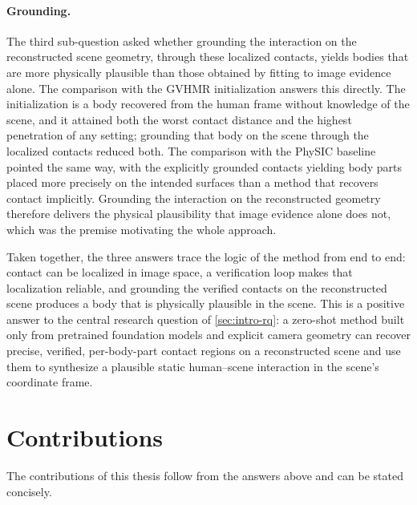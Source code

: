 \paragraph{Grounding.} The third sub-question asked whether grounding the interaction on the reconstructed scene geometry, through these localized contacts, yields bodies that are more physically plausible than those obtained by fitting to image evidence alone. The comparison with the GVHMR initialization answers this directly. The initialization is a body recovered from the human frame without knowledge of the scene, and it attained both the worst contact distance and the highest penetration of any setting; grounding that body on the scene through the localized contacts reduced both. The comparison with the PhySIC baseline pointed the same way, with the explicitly grounded contacts yielding body parts placed more precisely on the intended surfaces than a method that recovers contact implicitly. Grounding the interaction on the reconstructed geometry therefore delivers the physical plausibility that image evidence alone does not, which was the premise motivating the whole approach.

Taken together, the three answers trace the logic of the method from end to end: contact can be localized in image space, a verification loop makes that localization reliable, and grounding the verified contacts on the reconstructed scene produces a body that is physically plausible in the scene. This is a positive answer to the central research question of \cref{sec:intro-rq}: a zero-shot method built only from pretrained foundation models and explicit camera geometry can recover precise, verified, per-body-part contact regions on a reconstructed scene and use them to synthesize a plausible static human--scene interaction in the scene's coordinate frame.

\section{Contributions}
\label{sec:conclusion-contributions}

The contributions of this thesis follow from the answers above and can be stated concisely.

